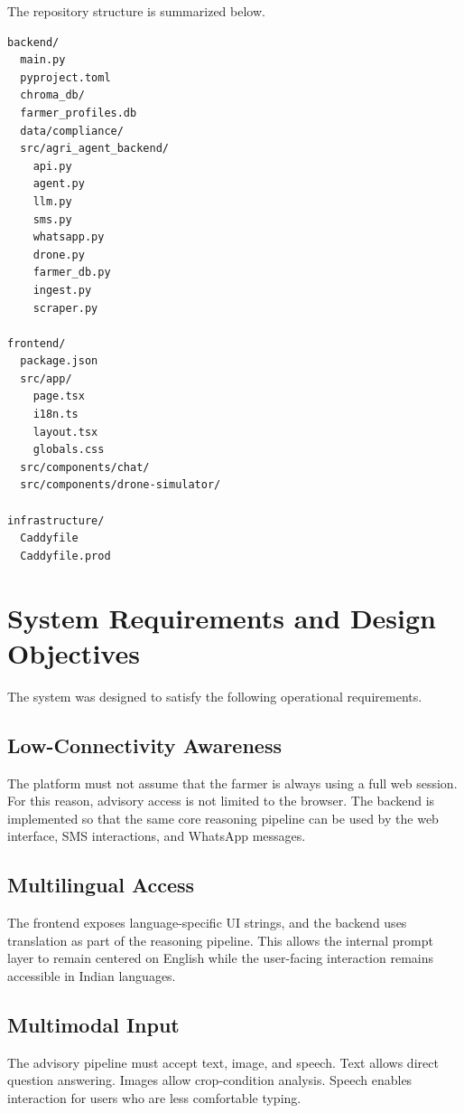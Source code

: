 \documentclass[11pt,a4paper]{article}
\begin{document}
The repository structure is summarized below.

\begin{verbatim}
backend/
  main.py
  pyproject.toml
  chroma_db/
  farmer_profiles.db
  data/compliance/
  src/agri_agent_backend/
    api.py
    agent.py
    llm.py
    sms.py
    whatsapp.py
    drone.py
    farmer_db.py
    ingest.py
    scraper.py

frontend/
  package.json
  src/app/
    page.tsx
    i18n.ts
    layout.tsx
    globals.css
  src/components/chat/
  src/components/drone-simulator/

infrastructure/
  Caddyfile
  Caddyfile.prod
\end{verbatim}

\section{System Requirements and Design Objectives}

The system was designed to satisfy the following operational requirements.

\subsection{Low-Connectivity Awareness}

The platform must not assume that the farmer is always using a full web session. For this reason, advisory access is not limited to the browser. The backend is implemented so that the same core reasoning pipeline can be used by the web interface, SMS interactions, and WhatsApp messages.

\subsection{Multilingual Access}

The frontend exposes language-specific UI strings, and the backend uses translation as part of the reasoning pipeline. This allows the internal prompt layer to remain centered on English while the user-facing interaction remains accessible in Indian languages.

\subsection{Multimodal Input}

The advisory pipeline must accept text, image, and speech. Text allows direct question answering. Images allow crop-condition analysis. Speech enables interaction for users who are less comfortable typing.
\end{document}
